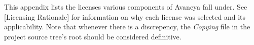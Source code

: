 

This appendix lists the licenses various components of Avaneya fall under. See [Licensing Rationale] for information on why each license was selected and its applicability. Note that whenever there is a discrepency, the {\it Copying} file in the project source tree's root should be considered definitive.

\page
{}


\page
{}


\page
{}


\page
{}


\StopChapter

